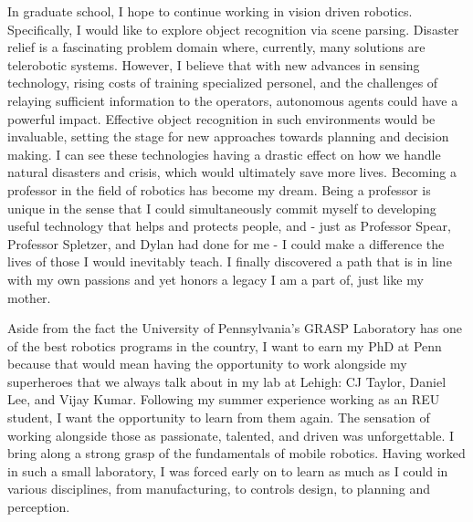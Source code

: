 \documentclass{article}
\begin{document}
In graduate school, I hope to continue working in vision driven robotics.
Specifically, I would like to explore object recognition via scene parsing.
Disaster relief is a fascinating problem domain where, currently, many
solutions are telerobotic systems. However, I believe that with new advances in
sensing technology, rising costs of training specialized personel, and the
challenges of relaying sufficient information to the operators, autonomous
agents could have a powerful impact. Effective object recognition in such
environments would be invaluable, setting the stage for new approaches towards
planning and decision making. I can see these technologies having a drastic
effect on how we handle natural disasters and crisis, which would ultimately
save more lives. Becoming a professor in the field of robotics has become my
dream. Being a professor is unique in the sense that I could simultaneously
commit myself to developing useful technology that helps and protects people,
and - just as Professor Spear, Professor Spletzer, and Dylan had done for me -
I could make a difference the lives of those I would inevitably teach. I
finally discovered a path that is in line with my own passions and yet honors a
legacy I am a part of, just like my mother.

Aside from the fact the University of Pennsylvania’s GRASP Laboratory has one
of the best robotics programs in the country, I want to earn my PhD at Penn
because that would mean having the opportunity to work alongside my superheroes
that we always talk about in my lab at Lehigh: CJ Taylor, Daniel Lee, and Vijay
Kumar. Following my summer experience working as an REU student, I want the
opportunity to learn from them again. The sensation of working alongside those
as passionate, talented, and driven was unforgettable.  I bring along a strong
grasp of the fundamentals of mobile robotics. Having worked in such a small
laboratory, I was forced early on to learn as much as I could in various
disciplines, from manufacturing, to controls design, to planning and
perception. 
\end{document}
